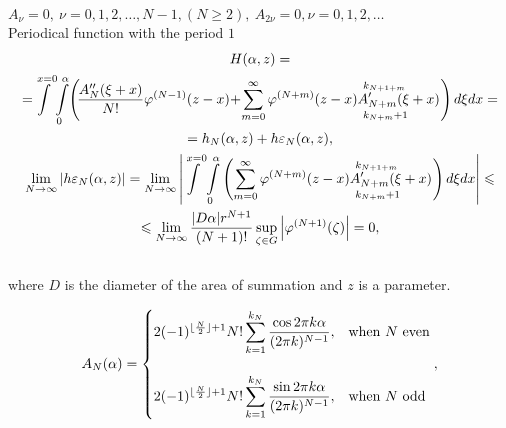 \documentclass[12pt]{article}
\theoremstyle{plain}
\theoremstyle{definition}
\numberwithin{equation}{section}
\begin{document}
$A_{\nu}=0,\ \nu=0,1,2,\dots,N-1,(N\geqslant2),\ A_{2\nu}=0,\nu=0,1,2,\dots$\\%

Periodical function with the period $1$\\
\begin{multline*}
H(\alpha,z)=\\
=\hspace{-0.2em}\int\limits^{x=0}\hspace{-0.1em}\int\limits_0^{\alpha}\hspace{-0.2em}\left(\hspace{-0.2em}\frac{A''_N(\xi+x)}{N!}\varphi^{(N-1)}(z-x)\hspace{-0.2em}+\hspace{-0.2em}\sum_{m=0}^{\infty}\varphi^{(N+m)}(z-x)A_{N+m}'(\xi+x)\hspace{-5.5em}\rule[-10pt]{0pt}{2.3em}_{k_{N+m}+1}^{k_{N+1+m}}\hspace{2.3em}\right)d\xi dx=\\
=h_N(\alpha,z)+h\varepsilon_N(\alpha,z),\\
\lim_{N\to\infty}\left|h\varepsilon_N(\alpha,z)\right|=\lim_{N\to\infty}\left|\int\limits^{x=0}\int\limits_0^{\alpha}\left(\sum_{m=0}^{\infty}\varphi^{(N+m)}(z-x)A_{N+m}'(\xi+x)\hspace{-5.5em}\rule[-10pt]{0pt}{2.3em}_{k_{N+m}+1}^{k_{N+1+m}}\hspace{2.3em}\right) d\xi dx\right|\leqslant\\
\leqslant\lim_{N\to\infty}\frac{|D\alpha|r^{N+1}}{(N+1)!}\sup_{\zeta\in G}\left|\varphi^{(N+1)}(\zeta)\right|=0,
\end{multline*}\\
where $D$ is the diameter of the area of summation and $z$ is a parameter.

\begin{equation*}
A_N(\alpha)=\begin{cases}
\displaystyle{2(-1)^{\lfloor\frac{N}{2}\rfloor+1}N!\sum_{k=1}^{k_{N}}\frac{\cos 2\pi k\alpha}{(2\pi k)^{N-1}}},&\text{when $N$ even}\\
\rule{0pt}{1em}\\
\displaystyle{2(-1)^{\lfloor\frac{N}{2}\rfloor+1}N!\sum_{k=1}^{k_{N}}\frac{\sin 2\pi k\alpha}{(2\pi k)^{N-1}}},&\text{when $N$ odd}
\end{cases},
\end{equation*}
\end{document}
